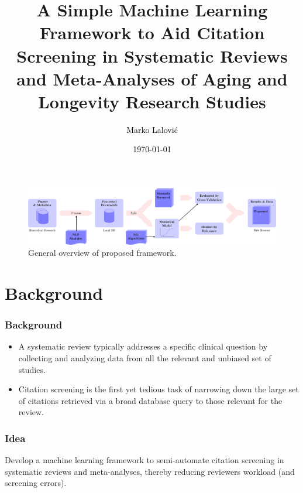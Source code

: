 \documentclass[10pt, xcolor={dvipsnames}]{beamer}
\title[Longevity Research Screening]{A Simple Machine Learning Framework to Aid Citation Screening in Systematic Reviews and Meta-Analyses of Aging and Longevity Research Studies}
\author[\textcolor{white}{Marko Lalović}]{\textcolor{black}{Marko Lalović}}
\date[\textcolor{white}{\today}]{\textcolor{black}{\today}}
\begin{document}
\begin{frame}
\begin{center}
\maketitle
\begin{figure}
    \includegraphics[width=\linewidth]{../report/diagrams/general-overview/general-overview-crop.pdf}
    \caption{General overview of proposed framework.}
\end{figure}    
\end{center}
\end{frame}



\section{Background}
\begin{frame}
\frametitle{Background}
\begin{itemize}
\item A systematic review typically addresses a specific clinical question by collecting and analyzing data from all the relevant and unbiased set of studies. 
\item Citation screening is the first yet tedious task of narrowing down the large set of citations retrieved via a broad database query to those relevant for the review.
\end{itemize}
\end{frame}

\begin{frame}
\frametitle{Idea}
Develop a machine learning framework to semi-automate citation screening in systematic reviews and meta-analyses, thereby reducing reviewers workload (and screening errors).
\end{frame}
\end{document}
